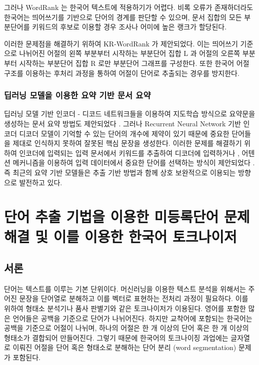 \documentclass[oneside, ko,phd]{snuthesis_utf8_kor}
\begin{document}
그러나 WordRank 는 한국어 텍스트에 적용하기가 어렵다.
비록 오류가 존재하더라도 한국어는 띄어쓰기를 기반으로 단어의 경계를 판단할 수 있으며, 문서 집합의 모든 부분단어를 키워드의 후보로 이용할 경우 조사나 어미에 높은 랭크가 할당된다.

이러한 문제점을 해결하기 위하여 KR-WordRank \cite{kim2014kr} 가 제안되었다.
이는 띄어쓰기 기준으로 나뉘어진 어절의 왼쪽 부분부터 시작하는 부분단어 집합 L 과 어절의 오른쪽 부분부터 시작하는 부분단어 집합 R 로만 부분단어 그래프를 구성한다.
또한 한국어 어절 구조를 이용하는 후처리 과정을 통하여 어절이 단어로 추출되는 경우를 방지한다.

\subsection{딥러닝 모델을 이용한 요약 기반 문서 요약}

딥러닝 모델 기반 인코더 - 디코드 네트워크들을 이용하여 지도학습 방식으로 요약문을 생성하는 문서 요약 방법도 제안되었다 \cite{rush2015neural}.
그러나 Recurrent Neural Network 기반 인코더 디코더 모델이 기억할 수 있는 단어의 개수에 제약이 있기 때문에 중요한 단어들을 제대로 인식하지 못하여 잘못된 핵심 문장을 생성한다.
이러한 문제를 해결하기 위하여 인코더에 입력되는 입력 문서에서 키워드를 추출하여 디코더에 입력하거나 \cite{nallapati2016abstractive}, 어텐션 메커니즘을 이용하여 입력 데이터에서 중요한 단어를 선택하는 방식이 제안되었다 \cite{see2017get, gu2016incorporating}.
즉 최근의 요약 기반 모델들은 추출 기반 방법과 함께 상호 보완적으로 이용되는 방향으로 발전하고 있다.

\newpage
\chapter{단어 추출 기법을 이용한 미등록단어 문제 해결 및 이를 이용한 한국어 토크나이저} \label{word_extraction}

\section{서론}
단어는 텍스트를 이루는 기본 단위이다.
머신러닝을 이용한 텍스트 분석을 위해서는 주어진 문장을 단어열로 분해하고 이를 벡터로 표현하는 전처리 과정이 필요하다.
이를 위하여 형태소 분석기나 품사 판별기와 같은 토크나이저가 이용된다.
영어를 포함한 많은 언어들은 공백을 기준으로 단어가 나뉘어진다.
하지만 교착어에 포함되는 한국어는 공백을 기준으로 어절이 나뉘며, 하나의 어절은 한 개 이상의 단어 혹은 한 개 이상의 형태소가 결합되어 만들어진다.
그렇기 때문에 한국어의 토크나이징 과업에는 글자열로 이뤄진 어절을 단어 혹은 형태소로 분해하는 단어 분리 (word segmentation) 문제가 포함된다.
\end{document}

